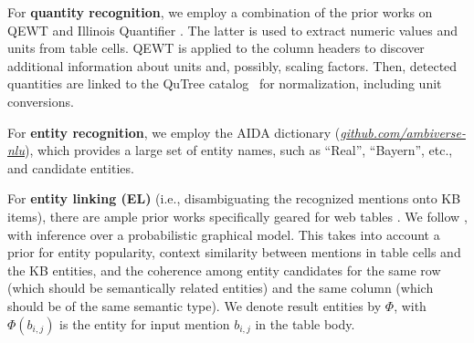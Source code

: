
For {\bf quantity recognition}, we employ a combination
of the prior works on QEWT \cite{DBLP:conf/kdd/SarawagiC14} and 
Illinois Quantifier \cite{DBLP:journals/tacl/RoyVR15}.
The latter is used to extract numeric values and units from table cells. 
QEWT is applied to the column headers to discover additional information about units and, possibly, scaling factors. Then, detected quantities are linked to the QuTree catalog~\cite{DBLP:conf/kdd/SarawagiC14} for normalization, including unit conversions.  

For \textbf{entity recognition}, 
we employ the
AIDA dictionary (\textit{\url{github.com/ambiverse-nlu}}), which provides a large set of entity 
names,
such as ``Real'', ``Bayern'', etc.,
and candidate entities.

For {\bf entity linking (EL)} (i.e., disambiguating the recognized mentions onto KB items), there are ample prior works specifically geared for web tables 
\cite{DBLP:journals/pvldb/LimayeSC10, DBLP:conf/semweb/BhagavatulaND15, DBLP:conf/cikm/IbrahimRW16, DBLP:conf/semweb/EfthymiouHRC17, DBLP:conf/edbt/RitzeB17}. We 
follow 
\cite{DBLP:conf/semweb/BhagavatulaND15}, with inference
over a probabilistic graphical model. This takes into account a prior for entity popularity, 
context similarity between mentions in table cells and the KB entities, and the coherence among entity candidates for the same row (which should be semantically related entities) and the same column (which should be of the same semantic type). We denote result entities by $\Phi$, with $\Phi(b_{i,j})$ is the entity for input mention $b_{i,j}$ in the table body. 




